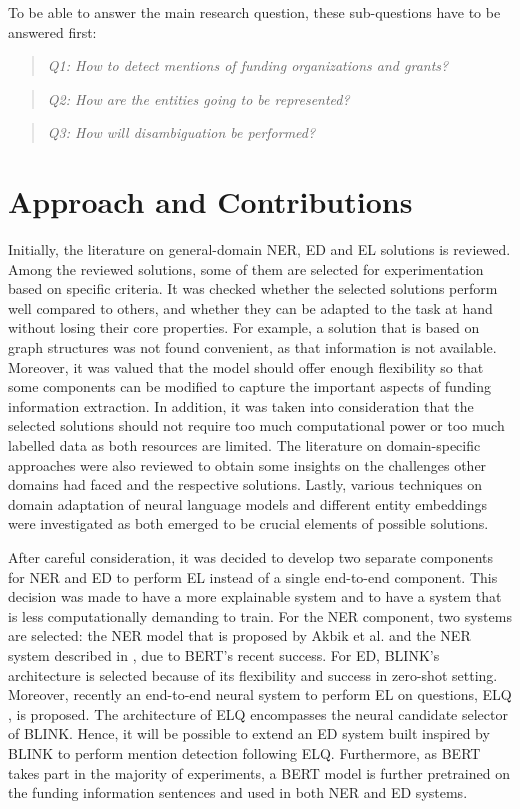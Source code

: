 \documentclass{report}
\theoremstyle{definition}
\theoremstyle{remark}
\begin{document}
\noindent To be able to answer the main research question, these sub-questions have to be answered first:

\begin{quote}\emph{Q1: How to detect mentions of funding organizations and grants?}\end{quote}
\begin{quote}\emph{Q2: How are the entities going to be represented?}\end{quote}
\begin{quote}\emph{Q3: How will disambiguation be performed?}\end{quote}


\section{Approach and Contributions}
Initially, the literature on general-domain NER, ED and EL solutions is reviewed. Among the reviewed solutions, some of them are selected for experimentation based on specific criteria. It was checked whether the selected solutions perform well compared to others, and whether they can be adapted to the task at hand without losing their core properties. For example, a solution that is based on graph structures was not found convenient, as that information is not available. Moreover, it was valued that the model should offer enough flexibility so that some components can be modified to capture the important aspects of funding information extraction. In addition, it was taken into consideration that the selected solutions should not require too much computational power or too much labelled data as both resources are limited. The literature on domain-specific approaches were also reviewed to obtain some insights on the challenges other domains had faced and the respective solutions. Lastly, various techniques on domain adaptation of neural language models and different entity embeddings were investigated as both emerged to be crucial elements of possible solutions.  

After careful consideration, it was decided to develop two separate components for NER and ED to perform EL instead of a single end-to-end component. This decision was made to have a more explainable system and to have a system that is less computationally demanding to train. For the NER component, two systems are selected: the NER model that is proposed by Akbik et al. \cite{flairlib} and the NER system described in \cite{BERT}, due to BERT's \cite{BERT} recent success. For ED, BLINK's architecture \cite{scalablezeroshot} is selected because of its flexibility and success in zero-shot setting. Moreover, recently an end-to-end neural system to perform EL on questions, ELQ \cite{elq}, is proposed. The architecture of ELQ encompasses the neural candidate selector of BLINK. Hence, it will be possible to extend an ED system built inspired by BLINK to perform mention detection following ELQ. Furthermore, as BERT takes part in the majority of experiments, a BERT model is further pretrained on the funding information sentences and used in both NER and ED systems. 
\end{document}
